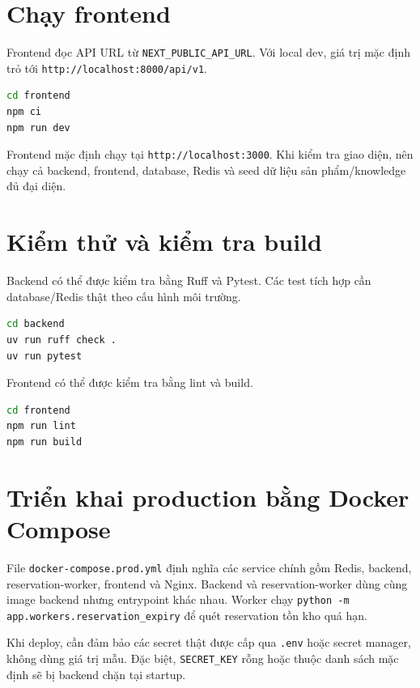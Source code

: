 \documentclass[../DoAn.tex]{subfiles}
\begin{document}
\section{Chạy frontend}
\label{appendix:A.4}

Frontend đọc API URL từ \texttt{NEXT\_PUBLIC\_API\_URL}. Với local dev, giá trị mặc định trỏ tới \texttt{http://localhost:8000/api/v1}.

\begin{lstlisting}[language=bash,caption={Cài đặt và chạy frontend}]
cd frontend
npm ci
npm run dev
\end{lstlisting}

Frontend mặc định chạy tại \texttt{http://localhost:3000}. Khi kiểm tra giao diện, nên chạy cả backend, frontend, database, Redis và seed dữ liệu sản phẩm/knowledge đủ đại diện.

\section{Kiểm thử và kiểm tra build}
\label{appendix:A.5}

Backend có thể được kiểm tra bằng Ruff và Pytest. Các test tích hợp cần database/Redis thật theo cấu hình môi trường.

\begin{lstlisting}[language=bash,caption={Kiểm tra backend}]
cd backend
uv run ruff check .
uv run pytest
\end{lstlisting}

Frontend có thể được kiểm tra bằng lint và build.

\begin{lstlisting}[language=bash,caption={Kiểm tra frontend}]
cd frontend
npm run lint
npm run build
\end{lstlisting}

\section{Triển khai production bằng Docker Compose}
\label{appendix:A.6}

File \texttt{docker-compose.prod.yml} định nghĩa các service chính gồm Redis, backend, reservation-worker, frontend và Nginx. Backend và reservation-worker dùng cùng image backend nhưng entrypoint khác nhau. Worker chạy \texttt{python -m app.workers.reservation\_expiry} để quét reservation tồn kho quá hạn.

Khi deploy, cần đảm bảo các secret thật được cấp qua \texttt{.env} hoặc secret manager, không dùng giá trị mẫu. Đặc biệt, \texttt{SECRET\_KEY} rỗng hoặc thuộc danh sách mặc định sẽ bị backend chặn tại startup.
\end{document}
